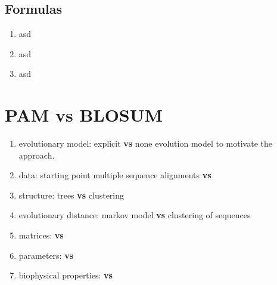 \documentclass[11pt]{article}
\begin{document}
\subsection{Formulas} %
\label{sub:formulas}
\begin{enumerate}
	\item asd
	\item asd
	\item asd
\end{enumerate}

\section{PAM vs BLOSUM} %
\label{sec:pam_vs_blosum}
\begin{enumerate}
	\item evolutionary model: explicit \textbf{vs} none evolution model to motivate the approach.
	\item data: starting point multiple sequence alignments \textbf{vs}
	\item structure: trees \textbf{vs} clustering
	\item evolutionary distance: markov model \textbf{vs} clustering of sequences
	\item matrices: \textbf{vs}
	\item parameters: \textbf{vs}
	\item biophysical properties: \textbf{vs}
\end{enumerate}

\end{document}
